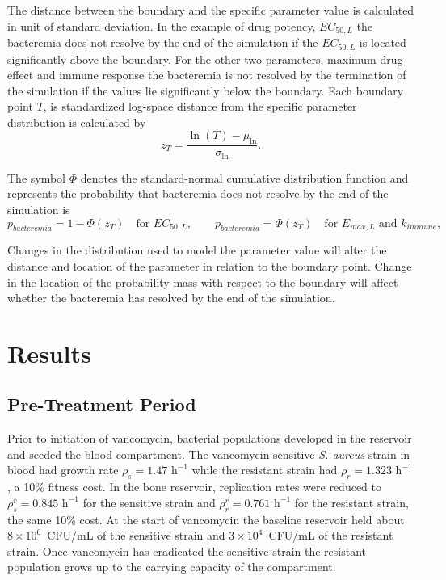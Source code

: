 \documentclass[12pt, draftcls, onecolumn]{IEEEtran}
\begin{document}
The distance between the boundary and the specific parameter value is calculated in unit of standard deviation.
In the example of drug potency, $EC_{50,L}$ the bacteremia does not resolve by the end of the simulation if the $EC_{50,L}$ is
located significantly above the boundary. For the other two parameters, maximum drug effect and immune response
the bacteremia is not resolved by the termination of the simulation if the values lie significantly below the boundary.  
Each boundary point $T$, is standardized log-space distance from the
specific parameter distribution is calculated by
\begin{equation}
z_T=\frac{\ln(T)-\mu_{\ln}}{\sigma_{\ln}}.
\label{eq:lognormal-switch-z}
\end{equation}

The symbol $\Phi$ denotes the standard-normal cumulative distribution function and represents the
probability that bacteremia does not resolve by the end of the simulation is
\begin{equation}
p_{bacteremia}=1-\Phi(z_T) \quad \text{for } EC_{50,L}, \qquad
p_{bacteremia}=\Phi(z_T) \quad \text{for } E_{max,L}\text{ and }k_{immune},
\label{eq:lognormal-bacteremia-tail}
\end{equation}

Changes in the distribution used to model the parameter value will alter the distance and location of the parameter in relation to the boundary point.  Change in the location of the probability mass with respect to the boundary will affect whether the bacteremia has resolved by the end of the simulation.




\maketitle
\section{Results}

\subsection{Pre-Treatment Period}
Prior to initiation of vancomycin, bacterial populations developed in the reservoir and seeded the blood compartment. The vancomycin-sensitive \textit{S. aureus} strain in blood had growth rate $\rho_s = 1.47\text{ h}^{-1}$ while the resistant strain had $\rho_r = 1.323\text{ h}^{-1}$, a 10\% fitness cost. In the bone reservoir, replication rates were reduced to $\rho_s^r = 0.845\text{ h}^{-1}$ for the sensitive strain and $\rho_r^r = 0.761\text{ h}^{-1}$ for the resistant strain, the same 10\% cost.
At the start of vancomycin the baseline reservoir held about $8\times10^{6}$~CFU/mL of the
sensitive strain and $3\times10^{4}$~CFU/mL of the resistant strain.
Once vancomycin has eradicated the sensitive strain the resistant population grows up to the carrying capacity of the compartment.
\end{document}
